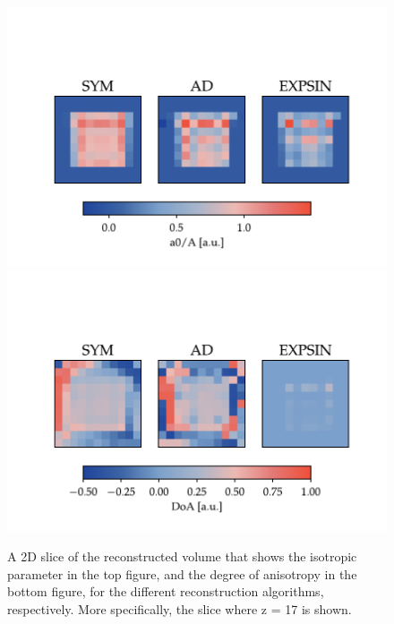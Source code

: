 \begin{figure}[h!]
    \centering
    \includegraphics[trim={0 0cm 0 2.5cm},clip,width=1\textwidth]{./svg-inkscape/P_slices_A_svg-tex.pdf}
    \includegraphics[trim={0 0cm 0 2.5cm},clip,width=1\textwidth]{./svg-inkscape/P_slices_DoA_svg-tex.pdf}
    \caption{ A 2D slice of the reconstructed volume that shows the isotropic parameter in the top figure, and the degree of anisotropy in the bottom figure, for the different reconstruction algorithms, respectively.
        More specifically, the slice where z = 17 is shown.}
    \label{fig:phantom_reconstruction_2D}
\end{figure}

